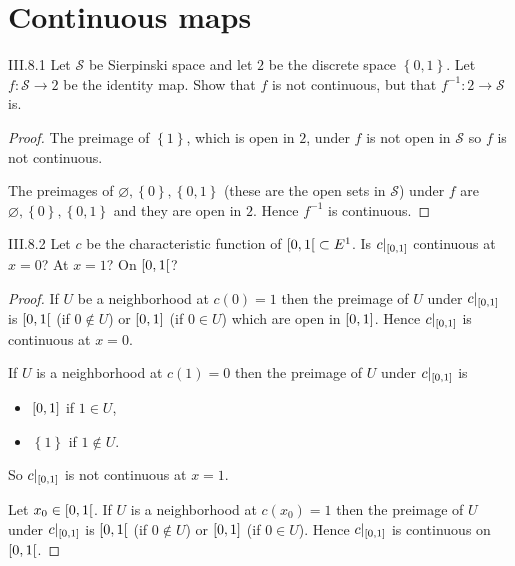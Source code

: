 \section{Continuous maps}

\begin{problem}{III.8.1}
Let \( \mathscr{S} \) be Sierpinski space and let \(2\) be the discrete space \( \left\{ 0, 1 \right\} \). Let \( f: \mathscr{S} \to 2 \) be the identity map. Show that \( f \) is not continuous, but that \( f^{-1}: 2 \to \mathscr{S} \) is.
\end{problem}

\begin{proof}
    The preimage of \( \left\{ 1 \right\} \), which is open in \(2\), under \( f \) is not open in \( \mathscr{S} \) so \( f \) is not continuous.

    The preimages of \( \varnothing, \left\{ 0 \right\}, \left\{ 0, 1 \right\} \) (these are the open sets in \(\mathscr{S}\)) under \( f \) are \( \varnothing, \left\{ 0 \right\}, \left\{ 0, 1 \right\} \) and they are open in \( 2 \). Hence \( f^{-1} \) is continuous.
\end{proof}

\begin{problem}{III.8.2}
Let \(c\) be the characteristic function of \( \left\lbrack{0, 1}\right\lbrack \subset E^{1} \). Is \( c\vert_{\left\lbrack{0, 1}\right\rbrack} \) continuous at \( x = 0 \)? At \( x = 1 \)? On \( \left\lbrack{0, 1}\right\lbrack \)?
\end{problem}

\begin{proof}
    If \(U\) be a neighborhood at \( c(0) = 1 \) then the preimage of \(U\) under \( c\vert_{\left\lbrack{0,1}\right\rbrack} \) is \( \left\lbrack{0,1}\right\lbrack \) (if \( 0 \notin U \)) or \( \left\lbrack{0, 1}\right\rbrack \) (if \( 0 \in U \)) which are open in \( \left\lbrack{0,1}\right\rbrack \). Hence \( c\vert_{\left\lbrack{0,1}\right\rbrack} \) is continuous at \( x = 0 \).

    If \( U \) is a neighborhood at \( c(1) = 0 \) then the preimage of \(U\) under \( c\vert_{\left\lbrack{0,1}\right\rbrack} \) is
    \begin{itemize}[itemsep=0pt,topsep=0pt]
        \item \( \left\lbrack{0,1}\right\rbrack \) if \( 1 \in U \),
        \item \( \left\{1\right\} \) if \( 1 \notin U \).
    \end{itemize}

    So \( c\vert_{\left\lbrack{0,1}\right\rbrack} \) is not continuous at \( x = 1 \).

    Let \( x_{0} \in \left\lbrack{0, 1}\right\lbrack \). If \( U \) is a neighborhood at \( c(x_{0}) = 1 \) then the preimage of \( U \) under \( c\vert_{\left\lbrack{0,1}\right\rbrack} \) is \( \left\lbrack{0,1}\right\lbrack \) (if \( 0 \notin U \)) or \( \left\lbrack{0,1}\right\rbrack \) (if \( 0 \in U \)). Hence \( c\vert_{\left\lbrack{0,1}\right\rbrack} \) is continuous on \( \left\lbrack{0,1}\right\lbrack \).
\end{proof}

